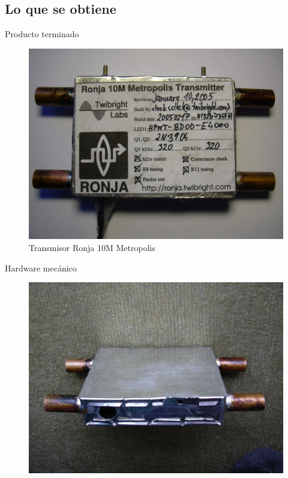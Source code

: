 \documentclass{beamer}
\begin{document}
\subsection{Lo que se obtiene}

\begin{frame}{Producto terminado}
  \begin{figure}
    \includegraphics[scale=0.85]{transmisor/1b80}
    \caption{Transmisor Ronja 10M Metropolis}
  \end{figure}
\end{frame}

\begin{frame}{Hardware mecánico}
  \begin{figure}
    \includegraphics[scale=0.9]{transmisor/1b50}
  \end{figure}
\end{frame}
\end{document}

